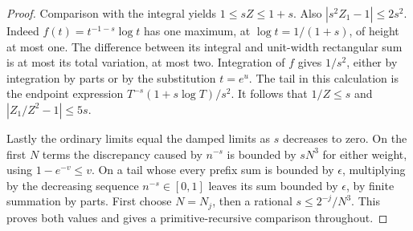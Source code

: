 \begin{proof}
Comparison with the integral yields $1\le sZ\le1+s$. Also $|s^2 Z_1-1|\le2s^2$. Indeed $f(t)=t^{-1-s}\log t$ has one maximum, at $\log t=1/(1+s)$, of height at most one. The difference between its integral and unit-width rectangular sum is at most its total variation, at most two. Integration of $f$ gives $1/s^2$, either by integration by parts or by the substitution $t=e^u$. The tail in this calculation is the endpoint expression $T^{-s}(1+s\log T)/s^2$. It follows that $1/Z\le s$ and $|Z_1/Z^2-1|\le5s$.

Lastly the ordinary limits equal the damped limits as $s$ decreases to zero. On the first $N$ terms the discrepancy caused by $n^{-s}$ is bounded by $sN^3$ for either weight, using $1-e^{-v}\le v$. On a tail whose every prefix sum is bounded by $\epsilon$, multiplying by the decreasing sequence $n^{-s}\in[0,1]$ leaves its sum bounded by $\epsilon$, by finite summation by parts. First choose $N=N_j$, then a rational $s\le 2^{-j}/N^3$. This proves both values and gives a primitive-recursive comparison throughout.
\end{proof}

